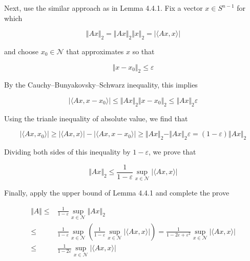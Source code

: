 \documentclass{article}
\begin{document}
Next, use the similar approach as in Lemma 4.4.1. Fix a vector $x \in S^{n-1}$ for which

$$\Vert Ax \Vert_2 = \Vert Ax \Vert_2 \Vert x \Vert_2 = |\langle Ax, x \rangle|$$

and choose $x_0 \in \mathcal N$ that approximates $x$ so that

$$\Vert x - x_0 \Vert_2 \leq \varepsilon$$

By the Cauchy–Bunyakovsky–Schwarz inequality, this implies

$$|\langle Ax, x - x_0 \rangle| \leq \Vert Ax \Vert_2 \Vert x - x_0 \Vert_2 \leq \Vert Ax \Vert_2 \varepsilon$$

Using the trianle inequality of absolute value, we find that

$$|\langle Ax, x_0 \rangle| \geq |\langle Ax, x \rangle| - |\langle Ax, x - x_0 \rangle| \geq \Vert Ax \Vert_2 - \Vert Ax \Vert_2 \varepsilon = (1 - \varepsilon) \Vert Ax \Vert_2$$

Dividing both sides of this inequality by $1 - \varepsilon$, we prove that

$$\Vert Ax \Vert_2 \leq \frac{1}{1-\varepsilon}\sup_{x \in \mathcal N}|\langle Ax, x \rangle|$$

Finally, apply the upper bound of Lemma 4.4.1 and complete the prove

\begin{equation*}
    \begin{aligned}
        \Vert A \Vert \leq & \frac{1}{1-\varepsilon}\sup_{x \in \mathcal N} \Vert Ax \Vert_2 \\ 
        \leq & \frac{1}{1-\varepsilon}\sup_{x \in \mathcal N} \left( \frac{1}{1-\varepsilon}\sup_{x \in \mathcal N}|\langle Ax, x \rangle|\right) = \frac{1}{1-2\varepsilon+\varepsilon^2}\sup_{x \in \mathcal N}|\langle Ax, x \rangle| \\
        \leq & \frac{1}{1-2\varepsilon}\sup_{x \in \mathcal N}|\langle Ax, x \rangle|
    \end{aligned}
\end{equation*}
\end{document}
